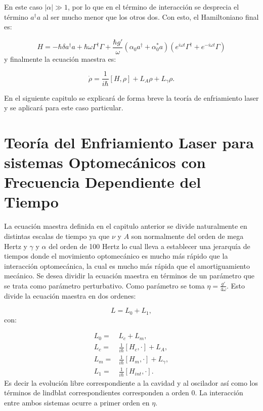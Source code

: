 \documentclass[a4paper,10pt]{report}
\begin{document}
En este caso $|\alpha| \gg 1$, por lo que en el término de interacción se desprecia el término $a^\dagger a$ al ser mucho menor que los otros dos. Con esto, el Hamiltoniano final es:

\begin{equation}
H = -\hbar \delta a^{\dagger}a +\hbar\omega\Gamma^{\dagger}\Gamma +\frac{\hbar g'}{\omega}(\alpha_0 a^{\dagger}+\alpha^*_0 a)(e^{i\omega t}\Gamma^{\dagger}+e^{-i\omega t}\Gamma)
\end{equation} y finalmente la ecuación maestra es:

\begin{equation}\label{LCMasterEq}
\dot{\rho} = \frac{1}{i\hbar}[H,\rho] +L_A\rho + L_\gamma \rho.
\end{equation}

En el siguiente capitulo se explicará de forma breve la teoría de enfriamiento laser y se aplicará para este caso particular.

\chapter{Teoría del Enfriamiento Laser para sistemas Optomecánicos con Frecuencia Dependiente del Tiempo}

La ecuación maestra definida en el capitulo anterior se divide naturalmente en distintas escalas de tiempo ya que $\nu$ y $A$ son normalmente del orden de mega Hertz y $\gamma$ y $\alpha$ del orden de 100 Hertz lo cual lleva a establecer una jerarquía de tiempos donde el movimiento optomecánico es mucho más rápido que la interacción optomecánica, la cual es mucho más rápida que el amortiguamiento mecánico. Se desea dividir la ecuación maestra en términos de un parámetro que se trata como parámetro perturbativo. Como parámetro se toma $\eta=\frac{g'}{4\omega}$. Esto divide la ecuación maestra en dos ordenes:

\begin{equation}
L = L_0 + L_1,
\end{equation} con:

\begin{align*}
L_0 =& L_c + L_m,\\
L_c =& \frac{1}{i\hbar}[H_c,\cdot] + L_A,\\
L_m =& \frac{1}{i\hbar}[H_m,\cdot] + L_\gamma,\\
L_1 =& \frac{1}{i\hbar}[H_{int},\cdot].
\end{align*} Es decir la evolución libre correspondiente a la cavidad y al oscilador así como los términos de lindblat correspondientes corresponden a orden 0. La interacción entre ambos sistemas ocurre a primer orden en $\eta$.
\end{document}
